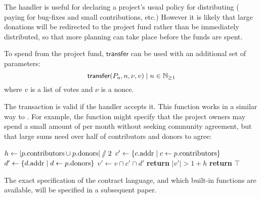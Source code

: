 The handler  is useful for declaring a project's usual policy for distributing \oscoin{}
(\eg{} paying for bug-fixes and small contributions, etc.) However it is likely
that large donations will be redirected to the project fund rather than be
immediately distributed, so that more planning can take place before the funds
are spent.

To spend \oscoin{} from the project fund, $\mathsf{transfer}$ can be used with an
additional set of parameters:
\[
    \mathsf{transfer}\lparen P_a, n, \nu, v\rparen \mid n \in \mathbb{N}_{\geq 1}
\]
where $v$ is a list of votes and $\nu$ is a nonce.

The transaction is valid if the handler  accepts
it. This function works in a similar way to . For
example, the function might specify that the project owners may spend a small
amount of \oscoin{} per month without seeking community agreement, but that
large sums need over half of contributors and donors to agree:
\medskip
\begin{algorithmic}[0]
            \State $h \gets |p.{\mathrm{contributors}} \cup p.{\mathrm{donors}}| \sslash 2$
            \State $c' \gets \{ c.{\mathrm{addr}} \mid c \gets p.{\mathrm{contributors}} \}$
            \State $d' \gets \{ d.{\mathrm{addr}} \mid d \gets p.{\mathrm{donors}} \}$
            \State $v' \gets v \cap c' \cap d'$
            \State \textbf{return} $|v'| > 1 + h$
            \Else
            \State \textbf{return} $\top$
        \EndIf
    \EndProcedure
\end{algorithmic}

The exact specification of the contract language, and which built-in functions
are available, will be specified in a subsequent paper.
